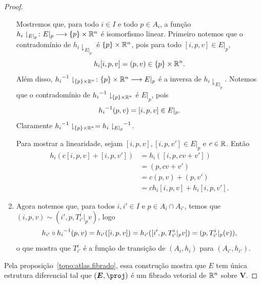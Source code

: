 \begin{proof}
\begin{enumerate}
Mostremos que, para todo $i \in I$ e todo $p \in A_i$, a função $h_i\downharpoonright_{E|_p} \colon E|_p \longrightarrow \{p\} \times \mathbb{R}^n$ é isomorfismo linear. Primeiro notemos que o contradomínio de $h_i\downharpoonright_{E|_p}$ é $\{p\} \times \mathbb{R}^n$, pois para todo $[i,p,v] \in E|_p$,
	\begin{equation*}
	h_i [i,p,v] = (p,v) \in \{p\} \times \mathbb{R}^n.
	\end{equation*}
Além disso, ${h_i}^{-1}\downharpoonright_{\{p\} \times \mathbb{R}^n} \colon \{p\} \times \mathbb{R}^n \longrightarrow E|_p$ é a inversa de $h_i\downharpoonright_{E|_p}$. Notemos que o contradomínio de ${h_i}^{-1}\downharpoonright_{\{p\} \times \mathbb{R}^n}$ é $E|_p$, pois
	\begin{equation*}
	{h_i}^{-1} (p,v) = [i,p,v] \in E|_p.
	\end{equation*}
Claramente ${h_i}^{-1}\downharpoonright_{\{p\} \times \mathbb{R}^n} = {h_i\downharpoonright_{E|_p}}^{-1}$.

Para mostrar a linearidade, sejam $[i,p,v], [i,p,v'] \in E|_p$ e $c \in \mathbb{R}$. Então
	\begin{align*}
	h_i (c[i,p,v] + [i,p,v']) &= h_i ([i,p,cv+v']) \\
		&= (p,cv+v') \\
		&= c(p,v) + (p,v') \\
		&= c h_i [i,p,v] + h_i[i,p,v'].
	\end{align*}

\item Agora notemos que, para todos $i,i' \in I$ e $p \in A_i \cap A_{i'}$, temos que $(i,p,v) \sim (i',p,T^i_{i'}|_p v)$, logo
	\begin{equation*}
	h_{i'} \circ {h_i}^{-1} (p,v) = h_{i'} ([i,p,v]) = h_{i'} ([i',p,T^i_{i'}|_p v]) = (p,T^i_{i'}|_p (v)),
	\end{equation*}
o que mostra que $T^i_{i'}$ é a função de transição de $(A_i,h_i)$ para $(A_{i'},h_{i'})$.
\end{enumerate}

Pela proposição~\ref{topo:atlas.fibrado}, essa construção mostra que $E$ tem única estrutura diferencial tal que $(\bm E, \proj)$ é um fibrado vetorial de $\mathbb{R}^n$ sobre $\bm V$.
\end{proof}

